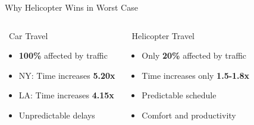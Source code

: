 \documentclass[aspectratio=169,9pt]{beamer}
\begin{document}
\begin{frame}{Why Helicopter Wins in Worst Case}
\begin{columns}
\begin{block}{\faCarSide\ Car Travel}
\begin{itemize}
    \item \textcolor{revoRed}{\textbf{100\%}} affected by traffic
    \item NY: Time increases \textcolor{revoRed}{\textbf{5.20x}}
    \item LA: Time increases \textcolor{revoRed}{\textbf{4.15x}}
    \item Unpredictable delays
\end{itemize}
\end{block}

\begin{block}{\faHelicopter\ Helicopter Travel}
\begin{itemize}
    \item Only \textcolor{revoGreen}{\textbf{20\%}} affected by traffic
    \item Time increases only \textcolor{revoGreen}{\textbf{1.5-1.8x}}
    \item Predictable schedule
    \item Comfort and productivity
\end{itemize}
\end{block}
\end{columns}

\vspace{0.5em}
\begin{center}
\end{center}
\end{frame}
\end{document}
